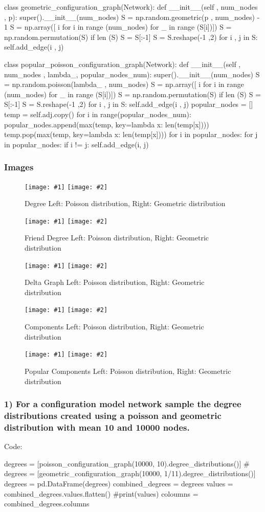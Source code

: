 \documentclass[a4paper, 11pt, oneside]{report}
\newcommand{\centreImageTwo}[3]{
    \begin{figure}[H]
        \centering
        \texttt{[image: \#1]}
        \texttt{[image: \#2]}
        \caption{#3}
        \label{fig:#1}
    \end{figure}
}
\begin{document}
\begin{verbnobox}[\fontsize{8pt}{8pt}\selectfont \mbox{}]
class geometric_configuration_graph(Network):
    def __init__(self , num_nodes , p):
        super().__init__(num_nodes)
        S = np.random.geometric(p , num_nodes) - 1
        S = np.array([ i for i in range (num_nodes) for _ in range (S[i])])
        S = np.random.permutation(S)
        if len (S) %
            S = S[:-1]
        S = S.reshape(-1 ,2)
        for i , j in S:
            self.add_edge(i , j)
 
class popular_poisson_configuration_graph(Network):
def __init__(self , num_nodes , lambda_, popular_nodes_num):
    super().__init__(num_nodes)
    S = np.random.poisson(lambda_ , num_nodes)
    S = np.array([ i for i in range (num_nodes) for _ in range (S[i])])
    S = np.random.permutation(S)
    if len (S) %
        S = S[:-1]
    S = S.reshape(-1 ,2)
    for i , j in S:
        self.add_edge(i , j)
    popular_nodes = []
    temp = self.adj.copy()
    for i in range(popular_nodes_num):
        popular_nodes.append(max(temp, key=lambda x: len(temp[x])))
        temp.pop(max(temp, key=lambda x: len(temp[x])))
    for i in popular_nodes:
        for j in popular_nodes:
            if i != j:
                self.add_edge(i, j)

\end{verbnobox}
\subsubsection*{Images}
\centreImageTwo{poiss.png}{goem.png}{Degree Left: Poisson distribution, Right: Geometric distribution}
\centreImageTwo{Poisson_friend.png}{Geo_friend.png}{Friend Degree Left: Poisson distribution, Right: Geometric distribution}
\centreImageTwo{Poisson_delta.png}{Geo_delta.png}{Delta Graph Left: Poisson distribution, Right: Geometric distribution}
\centreImageTwo{Poisson_components.png}{Geometric_components}{Components Left: Poisson distribution, Right: Geometric distribution}
\centreImageTwo{Poisson_popular_components.png}{Popular_components.png}{Popular Components Left: Poisson distribution, Right: Geometric distribution}
\pagebreak
\subsubsection*{1) For a configuration model network sample the degree distributions created using a poisson and geometric distribution with mean 10 and 10000 nodes.}
Code:
\begin{verbnobox}[\fontsize{8pt}{8pt}\selectfont]
    degrees = [poisson_configuration_graph(10000, 10).degree_distributions()]
    # degrees = [geometric_configuration_graph(10000, 1/11).degree_distributions()]
    degrees = pd.DataFrame(degrees)
    combined_degrees = degrees
    values = combined_degrees.values.flatten()
    #print(values)
    coloumns = combined_degrees.columns
\end{verbnobox}
\end{document}
